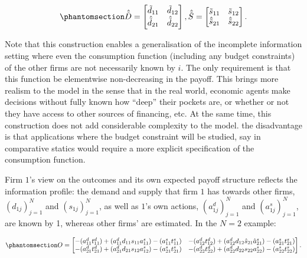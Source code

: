 \documentclass[
]{article}
\theoremstyle{definition}
\theoremstyle{plain}
\theoremstyle{remark}
\begin{document}
\begin{equation}\phantomsection\label{eq-tildeDS}{
\hat{\tilde{D}} = 
\begin{bmatrix}
\tilde{d}_{11} & \tilde{d}_{12} \\
\hat{\tilde{d}}_{21} & \hat{\tilde{d}}_{22}
\end{bmatrix}
,
\hat{\tilde{S}} = 
\begin{bmatrix}
\tilde{s}_{11} & \tilde{s}_{12} \\
\hat{\tilde{s}}_{21} & \hat{\tilde{s}}_{22}
\end{bmatrix}.
}\end{equation}

Note that this construction enables a generalisation of the incomplete
information setting where even the consumption function (including any
budget constraints) of the other firms are not necessarily known by
\(i\). The only requirement is that this function be elementwise
non-decreasing in the payoff. This brings more realism to the model in
the sense that in the real world, economic agents make decisions without
fully known how ``deep'' their pockets are, or whether or not they have
access to other sources of financing, etc. At the same time, this
construction does not add considerable complexity to the model. the
disadvantage is that applications where the budget constraint will be
studied, say in comparative statics would require a more explicit
specification of the consumption function.

Firm \(1\)'s view on the outcomes and its own expected payoff structure
reflects the information profile: the demand and supply that firm \(1\)
has towards other firms, \((d_{1j})_{j=1}^N\) and \((s_{1j})_{j=1}^N\),
as well as \(1\)'s own actions, \((a_{1j}^d)_{j=1}^N\) and
\((a_{1j}^s)_{j=1}^N\), are known by 1, whereas other firms' are
estimated. In the \(N=2\) example:

\begin{equation}\phantomsection\label{eq-iioutcomes}{
O = 
\begin{bmatrix}
-(a_{11}^d t_{11}^d) + (a_{11}^d d_{11} s_{11} a_{11}^s) - (a_{11}^s t_{11}^s) & -(a_{12}^d t_{12}^d) + (a_{12}^d d_{12} \hat{s}_{21} \hat{a}_{21}^s) - (a_{21}^s t_{21}^s)\\
-(a_{21}^d t_{21}^d) + (a_{21}^d d_{21} s_{12} a_{12}^s) - (a_{21}^s t_{21}^s) & -(a_{22}^d t_{22}^d) + (a_{22}^d d_{22} s_{22} a_{22}^s) - (a_{22}^s t_{22}^s)
\end{bmatrix}.
}\end{equation}
\end{document}
